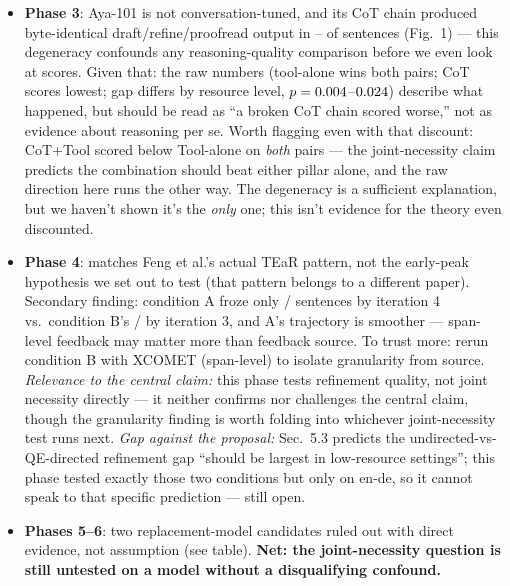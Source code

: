 \documentclass[11pt]{article}
\begin{document}
\begin{itemize}
  \item \textbf{Phase 3}: Aya-101 is not conversation-tuned, and its CoT chain produced
    byte-identical draft\slash refine\slash proofread output in
    \PhaseThreeCotVerbatimRepeatEnde--\PhaseThreeCottoolVerbatimRepeatEnha{} of
    \PhaseThreeVerbatimRepeatDenominator{} sentences (Fig.~1) --- this degeneracy confounds any
    reasoning-quality comparison before we even look at scores. Given that: the raw numbers
    (tool-alone wins both pairs; CoT scores lowest; gap differs by resource level,
    $p=0.004$--$0.024$) describe what happened, but should be read
    as ``a broken CoT chain scored worse,'' not as evidence about reasoning per se. Worth
    flagging even with that discount: CoT+Tool scored below Tool-alone on \emph{both} pairs ---
    the joint-necessity claim predicts the combination should beat either pillar alone, and the
    raw direction here runs the other way. The degeneracy is a sufficient explanation, but we
    haven't shown it's the \emph{only} one; this isn't evidence for the theory even discounted.
  \item \textbf{Phase 4}: matches Feng et al.'s actual TEaR pattern, not the early-peak
    hypothesis we set out to test (that pattern belongs to a different paper). Secondary
    finding: condition A froze only \PhaseFourCondAFrozenByIterFour/\PhaseFourNTotal{} sentences
    by iteration 4 vs.\ condition B's \PhaseFourCondBFrozenByIterThree/\PhaseFourNTotal{} by
    iteration 3, and A's trajectory is smoother --- span-level feedback may matter more than
    feedback source. To trust more: rerun condition B with XCOMET (span-level) to isolate
    granularity from source. \emph{Relevance to the central claim:} this phase tests refinement
    quality, not joint necessity directly --- it neither confirms nor challenges the central
    claim, though the granularity finding is worth folding into whichever joint-necessity test
    runs next. \emph{Gap against the proposal:} Sec.~5.3 predicts the undirected-vs-QE-directed
    refinement gap ``should be largest in low-resource settings''; this phase tested exactly
    those two conditions but only on en-de, so it cannot speak to that specific prediction ---
    still open.
  \item \textbf{Phases 5--6}: two replacement-model candidates ruled out with direct evidence,
    not assumption (see table). \textbf{Net: the joint-necessity question is still untested on
    a model without a disqualifying confound.}

\end{itemize}
\end{document}
